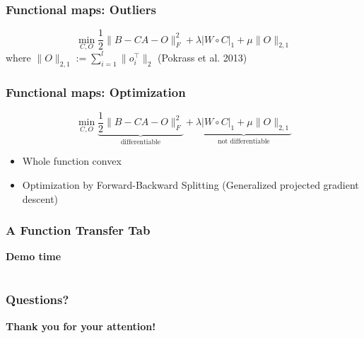 \documentclass[compress]{beamer}
\begin{document}
\begin{frame}[fragile]
\begin{figure}[htp]
\begin{center}
  \end{center}
\end{figure}
\end{frame}

\begin{frame}[fragile]
\frametitle{Functional maps: Outliers}
$$
	\min_{C,O} \frac{1}{2} \| B - CA -O \|_F^2 + \lambda |W \circ C|_1 + \mu \|O\|_{2,1}
$$
where $\|O\|_{2,1}:= \sum_{i=1}^l \|o_i^\top \|_2$ (Pokrass et al. 2013)
\end{frame}

\begin{frame}[fragile]
\frametitle{Functional maps: Optimization}
$$
	\min_{C,O} \underbrace{\frac{1}{2} \| B - CA -O \|_F^2}_{\text{differentiable}} +\underbrace{\lambda |W \circ C|_1 + \mu \|O\|_{2,1}}_{\text{not differentiable}}
$$
\begin{itemize}
\item Whole function convex
\item Optimization by Forward-Backward Splitting (Generalized projected gradient descent)
\end{itemize}
\end{frame}

\begin{frame}[fragile]
\frametitle{A Function Transfer Tab}
\bf{Demo time}
\end{frame}

\section*{}

\begin{frame}
\frametitle{Questions?}
\bf{Thank you for your attention!}
\end{frame}
\end{document}
